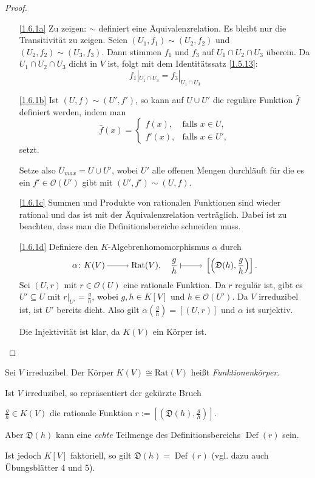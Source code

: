 \documentclass[a4paper,12pt,index=toc]{scrbook}
\theoremstyle{keinenummern} %
\def\O{\mathcal{O}}
\newcommand{\D}{\mathfrak{D}}
\newcommand{\Rat}{\mathrm{Rat}}
\newcommand{\Def}{\operatorname{Def}}
\newcommand{\restrict}[1]{|_{#1}}
\newcommand{\dach}{\widehat}
\begin{document}
\begin{proof}
\begin{enumerate}
\item[\ref{1.6.1a}] Zu zeigen: $\sim$ definiert eine Äquivalenzrelation. Es bleibt nur die Transitivität zu zeigen.
Seien $(U_1,f_1)\sim (U_2,f_2)$ und $(U_2,f_2)\sim (U_3,f_3)$. Dann stimmen $f_1$ und $f_3$ auf $U_1\cap U_2\cap U_3$ überein. Da $U_1\cap U_2\cap U_3$ dicht in $V$ ist, folgt mit dem Identitätssatz \cref{1.5.13}:
\[f_1\restrict{U_1\cap U_3}=f_3\restrict{U_1\cap U_3}\]
\item[\ref{1.6.1b}] Ist $(U,f)\sim(U',f')$, so kann auf $U\cup U'$ die reguläre Funktion $\dach{f}$ definiert werden, indem man 
\[\dach{f}(x)=\begin{cases} f(x),&\text{falls } x\in U, \\ f'(x),&\text{falls } x\in U',\end{cases}\] setzt.

Setze also $U_{max}=U\cup U'$, wobei $U'$ alle offenen Mengen durchläuft für die es ein $f'\in \O(U')$ gibt mit $(U',f')\sim (U,f)$.
\item[\ref{1.6.1c}] Summen und Produkte von rationalen Funktionen sind wieder rational und das ist mit der Äquivalenzrelation verträglich. Dabei ist zu beachten, dass man die Definitionsbereiche schneiden muss.
\item[\ref{1.6.1d}] Definiere den $K$-Algebrenhomomorphismus $\alpha$ durch
\[\alpha\colon K(V)\ra \Rat(V), \quad \frac{g}{h}\mapsto\relax \left[\left(\D(h),\frac{g}{h}\right)\right].\] 
Sei $(U,r)$ mit $r\in \O(U)$ eine rationale Funktion. Da $r$ regulär ist, gibt es $U'\subseteq U$ mit $r\restrict{U'}=\frac{g}{h}$, wobei
$g,h \in K[V]$ und $h\in \O(U')$. Da $V$ irreduzibel ist, ist $U'$ bereits dicht. Also gilt $\alpha(\frac{g}{h})=[(U,r)]$ und $\alpha$ ist surjektiv.

Die Injektivität ist klar, da $K(V)$ ein Körper ist.
\end{enumerate}
\end{proof}

\begin{dfn}\label{1.6.2}
Sei $V$ irreduzibel. Der Körper $K(V)\cong \Rat(V)$ heißt \emph{Funktionenkörper}.
\end{dfn}

\begin{w}
Ist $V$ irreduzibel, so repräsentiert der gekürzte Bruch\par $\frac{g}{h} \in K(V)$ die rationale Funktion $r:=[(\D(h),\frac{g}{h})]$.

Aber $\D(h)$ kann eine \textit{echte} Teilmenge des Definitionsbereichs $\Def(r)$ sein. 

Ist jedoch $K[V]$ faktoriell, so gilt $\D(h)=\Def(r)$ (vgl. dazu auch Übungsblätter 4 und 5).
\end{w}
\end{document}
